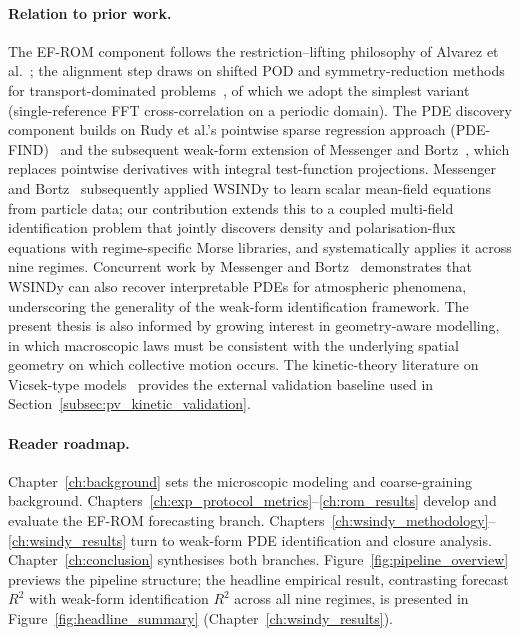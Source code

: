 \paragraph{Relation to prior work.}The EF-ROM component follows the restriction--lifting philosophy of Alvarez et al.~\cite{alvarez2025eqfree}; the alignment step draws on shifted POD and symmetry-reduction methods for transport-dominated problems~\cite{sonday2011alignment,budanur2015slices,reiss2018shifted_pod,black2020projection,siminos2015periodic,krah2024robust_spod}, of which we adopt the simplest variant (single-reference FFT cross-correlation on a periodic domain).  The PDE discovery component builds on Rudy et al.'s pointwise sparse regression approach (PDE-FIND)~\cite{rudy2017pdefind} and the subsequent weak-form extension of Messenger and Bortz~\cite{messenger2021wsindy}, which replaces pointwise derivatives with integral test-function projections.  Messenger and Bortz~\cite{messenger2022meanfield} subsequently applied WSINDy to learn scalar mean-field equations from particle data; our contribution extends this to a coupled multi-field identification problem that jointly discovers density and polarisation-flux equations with regime-specific Morse libraries, and systematically applies it across nine regimes.  Concurrent work by Messenger and Bortz~\cite{messenger2025atmospheric} demonstrates that WSINDy can also recover interpretable PDEs for atmospheric phenomena, underscoring the generality of the weak-form identification framework.  The present thesis is also informed by growing interest in geometry-aware modelling, in which macroscopic laws must be consistent with the underlying spatial geometry on which collective motion occurs.  The kinetic-theory literature on Vicsek-type models~\cite{bertin2006boltzmann,degond2008continuum,ihle2011kinetic,toner2005hydrodynamics} provides the external validation baseline used in Section~\ref{subsec:pv_kinetic_validation}.

\paragraph{Reader roadmap.}
Chapter~\ref{ch:background} sets the microscopic modeling and coarse-graining background.  Chapters~\ref{ch:exp_protocol_metrics}--\ref{ch:rom_results} develop and evaluate the EF-ROM forecasting branch.  Chapters~\ref{ch:wsindy_methodology}--\ref{ch:wsindy_results} turn to weak-form PDE identification and closure analysis.  Chapter~\ref{ch:conclusion} synthesises both branches.  Figure~\ref{fig:pipeline_overview} previews the pipeline structure; the headline empirical result, contrasting forecast $R^2$ with weak-form identification $R^2$ across all nine regimes, is presented in Figure~\ref{fig:headline_summary} (Chapter~\ref{ch:wsindy_results}).

